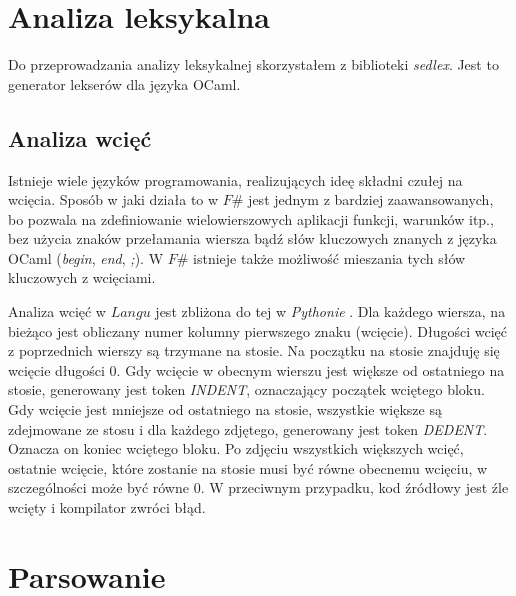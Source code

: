 \documentclass[declaration,shortabstract]{iithesis}
\begin{document}


\section{Analiza leksykalna}

Do przeprowadzania analizy leksykalnej skorzystałem z biblioteki 
\textit{sedlex}. Jest to generator lekserów dla języka OCaml.

\subsection{Analiza wcięć}
 
Istnieje wiele języków programowania, realizujących ideę składni czułej na 
wcięcia. Sposób w jaki działa to w $F\#$ jest jednym z bardziej zaawansowanych,
bo pozwala na zdefiniowanie wielowierszowych aplikacji funkcji, warunków itp., 
bez użycia znaków przełamania wiersza bądź słów kluczowych znanych 
z języka OCaml (\textit{begin}, \textit{end}, \textit{;}). W $F\#$ istnieje 
także możliwość mieszania tych słów kluczowych z wcięciami. 

Analiza wcięć w $Langu$ jest zbliżona do tej w \textit{Pythonie}
\cite{python_indentation}. Dla każdego wiersza, 
na bieżąco jest obliczany numer kolumny pierwszego znaku (wcięcie). Długości 
wcięć z poprzednich wierszy są trzymane na stosie. Na początku na stosie
znajduję się wcięcie długości 0. Gdy wcięcie w obecnym wierszu jest większe od 
ostatniego na stosie, generowany jest token \textit{INDENT}, oznaczający 
początek wciętego bloku. Gdy wcięcie jest mniejsze od ostatniego na stosie, 
wszystkie większe są zdejmowane ze stosu i dla każdego zdjętego, generowany 
jest token \textit{DEDENT}. Oznacza on koniec wciętego bloku. Po zdjęciu 
wszystkich większych wcięć, ostatnie wcięcie, które zostanie na stosie musi być 
równe obecnemu wcięciu, w szczególności może być równe $0$. W przeciwnym 
przypadku, kod źródłowy jest źle wcięty i kompilator zwróci błąd.

\section{Parsowanie}
\end{document}

